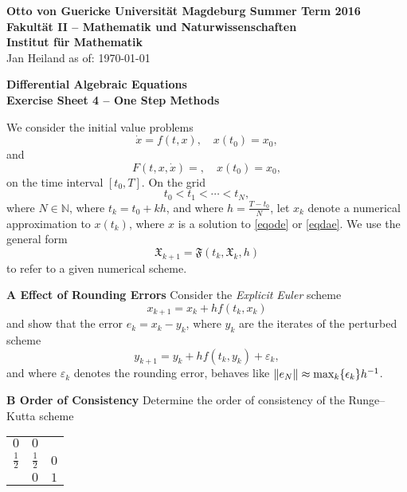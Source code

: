 \documentclass[a4paper,10pt]{article}
\begin{document}
{\bf Otto von Guericke Universit{\"a}t Magdeburg \hfill Summer Term 2016} \\
{\bf Fakult\"at II -- Mathematik und Naturwissenschaften} \\
{\bf Institut f\"ur Mathematik} \\
Jan Heiland \hfill as of: \today \\


\bigskip
\begin{center}
\textbf{\large Differential Algebraic Equations}\\
\smallskip
\textbf{Exercise Sheet 4 -- One Step Methods}\\
\end{center}

\bigskip

We consider the initial value problems 
\begin{equation}
	\dot x = f(t, x), \quad x(t_0) = x_0,
	\label{eqode}\tag{ODE}
\end{equation}
and 
\begin{equation}
	F(t, x, \dot x)=, \quad x(t_0) = x_0,
	\label{eqdae}\tag{DAE}
\end{equation}
on the time interval $[t_0, T]$. On the grid
$$t_0<t_1<\dotsm<t_N,$$
where $N\in\mathbb N$, where $t_k = t_0 + kh$, and where $h=\frac{T-t_0}{N}$, let $x_{k}$ denote a numerical approximation to $x(t_k)$, where $x$ is a solution to \eqref{eqode} or \eqref{eqdae}. We use the general form
\begin{equation*}
	\mathfrak X_{k+1} = \mathfrak F(t_{k}, \mathfrak X_{k}, h)
\end{equation*}
to refer to a given numerical scheme.

{\bf A Effect of Rounding Errors}
Consider the \emph{Explicit Euler} scheme
\begin{equation*}
	x_{k+1} = x_{k} + hf(t_{k}, x_{k})
\end{equation*}
and show that the error $e_{k} = x_{k} - y_{k}$, where $y_{k}$ are the iterates of the perturbed scheme
\begin{equation*}
	y_{k+1} = y_{k} + hf(t_{k}, y_{k}) + \varepsilon_{k},
\end{equation*}
and where $\varepsilon_{k}$ denotes the rounding error, behaves like $\lVert e_{N} \rVert \approx \max_{k}\{\epsilon_k\}h^{-1}$.

\smallskip
{\bf B Order of Consistency}
Determine the order of consistency of the Runge--Kutta scheme
\begin{table}[h]
	\centering
	\begin{tabular}{c|cc}
		$0$ &$ 0$ & \\
		$\frac 12$ &$ \frac 12$ &$ 0$\\
		\hline
		&$0$&$1$
	\end{tabular}
\end{table}
\end{document}
